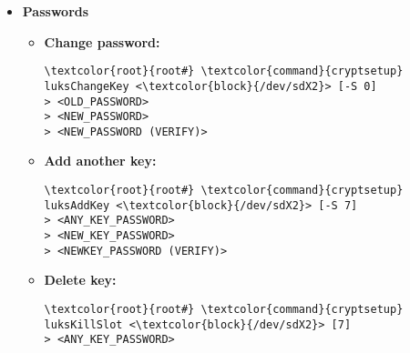 \documentclass[10pt, a4paper, onecolumn, oneside, titlepage, openany]{book}
\begin{document}
\begin{itemize}
\begin{enumerate}
    \end{enumerate}
    \item \textbf{Passwords}
    \begin{itemize}
        \item \textbf{Change password:}
\begin{Verbatim}[commandchars=\\\{\}]
\textcolor{root}{root#} \textcolor{command}{cryptsetup} luksChangeKey <\textcolor{block}{/dev/sdX2}> [-S 0]
> <OLD_PASSWORD>
> <NEW_PASSWORD>
> <NEW_PASSWORD (VERIFY)>
\end{Verbatim}
        \item \textbf{Add another key:}
\begin{Verbatim}[commandchars=\\\{\}]
\textcolor{root}{root#} \textcolor{command}{cryptsetup} luksAddKey <\textcolor{block}{/dev/sdX2}> [-S 7]
> <ANY_KEY_PASSWORD>
> <NEW_KEY_PASSWORD>
> <NEWKEY_PASSWORD (VERIFY)>
\end{Verbatim}
        \item \textbf{Delete key:}
\begin{Verbatim}[commandchars=\\\{\}]
\textcolor{root}{root#} \textcolor{command}{cryptsetup} luksKillSlot <\textcolor{block}{/dev/sdX2}> [7]
> <ANY_KEY_PASSWORD>
\end{Verbatim}
    \end{itemize}
\end{itemize}
\end{document}
